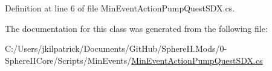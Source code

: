 Definition at line 6 of file Min\+Event\+Action\+Pump\+Quest\+S\+D\+X.\+cs.



The documentation for this class was generated from the following file\+:\begin{DoxyCompactItemize}
\item 
C\+:/\+Users/jkilpatrick/\+Documents/\+Git\+Hub/\+Sphere\+I\+I.\+Mods/0-\/\+Sphere\+I\+I\+Core/\+Scripts/\+Min\+Events/\mbox{\hyperlink{_min_event_action_pump_quest_s_d_x_8cs}{Min\+Event\+Action\+Pump\+Quest\+S\+D\+X.\+cs}}\end{DoxyCompactItemize}
